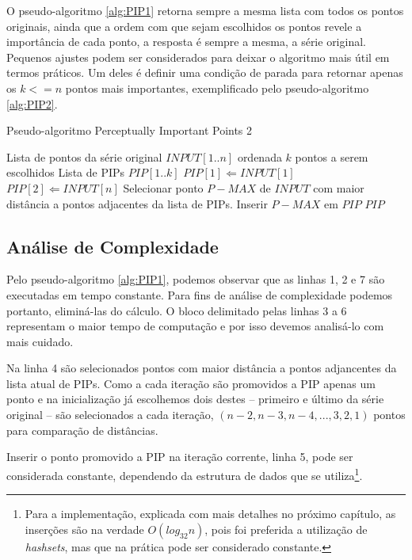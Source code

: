 O pseudo-algoritmo \ref{alg:PIP1} retorna sempre a mesma lista com todos os pontos originais, ainda que a ordem com que sejam escolhidos os pontos revele a importância de cada ponto, a resposta é sempre a mesma, a série original.
Pequenos ajustes podem ser considerados para deixar o algoritmo mais útil em termos práticos. Um deles é definir uma condição de parada para retornar apenas os $k <= n$ pontos mais importantes, exemplificado pelo pseudo-algoritmo \ref{alg:PIP2}.

\begin{algorithm}[h!]
  \caption{Pseudo-algoritmo Perceptually Important Points 2}
  \label{alg:PIP2}
  \begin{algorithmic}[1]
  \REQUIRE Lista de pontos da série original $INPUT[1..n]$ ordenada
  \REQUIRE $k$ pontos a serem escolhidos
  \ENSURE Lista de PIPs $PIP[1..k]$
  \STATE $PIP[1] \Leftarrow INPUT[1]$
  \STATE $PIP[2] \Leftarrow INPUT[n]$
  \REPEAT
    \STATE Selecionar ponto $P-MAX$ de $INPUT$ com maior distância a pontos adjacentes da lista de PIPs. 
    \STATE Inserir $P-MAX$ em $PIP$
  \RETURN $PIP$
  \end{algorithmic}
\end{algorithm}

\subsection{Análise de Complexidade}
Pelo pseudo-algoritmo \ref{alg:PIP1}, podemos observar que as linhas 1, 2 e 7 são executadas em tempo constante. Para fins de análise de complexidade podemos portanto, eliminá-las do cálculo. O bloco delimitado pelas linhas 3 a 6 representam o maior tempo de computação e por isso devemos analisá-lo com mais cuidado.

Na linha 4 são selecionados pontos com maior distância a pontos adjancentes da lista atual de PIPs. Como a cada iteração são promovidos a PIP apenas um ponto e na inicialização já escolhemos dois destes -- primeiro e último da série original -- são selecionados a cada iteração, $(n - 2, n - 3, n - 4, ..., 3, 2, 1)$ pontos para comparação de distâncias. 

Inserir o ponto promovido a PIP na iteração corrente, linha 5, pode ser considerada constante, dependendo da estrutura de dados que se utiliza\footnote{Para a implementação, explicada com mais detalhes no próximo capítulo, as inserções são na verdade $O(log_{32} n)$, pois foi preferida a utilização de \textit{hashsets}, mas que na prática pode ser considerado constante.}.

